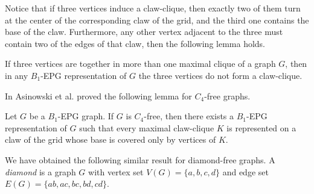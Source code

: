 \documentclass{dmgt}
\begin{document}
Notice that if three vertices induce a claw-clique, then exactly two of them turn at the center of the corresponding  claw of the grid, and the third one contains the
base of the claw. 
Furthermore, any other vertex  adjacent to the three  must contain two of the edges of that claw, then the following lemma holds.

\begin{lemma}\label{lem:cliquesMaximais}
If three vertices are together  in more than one maximal clique of a graph $G$, then in
any $B_1$-EPG representation of $G$ the three vertices do not form a claw-clique. %
\end{lemma}

%
 


In \cite{ries2009} Asinowski et al. proved the following lemma for $C_4$-free graphs.

\begin{lemma} \cite{ries2009} \label{lem:lemaBRies2009}
Let $G$ be a $B_1$-EPG graph. If $G$ is $C_4$-free, then there exists a $B_1$-EPG representation of $G$ such that every  maximal claw-clique $K$ is represented on a claw of the grid whose base is covered only by vertices of $K$.
\end{lemma}


We have obtained the following similar result for diamond-free graphs. A \textit{diamond} is a graph $G$ with vertex set $V(G) = \{a, b, c, d\}$ and edge set $E(G)=\{ab, ac,bc, bd,cd\}$.%
\end{document}
